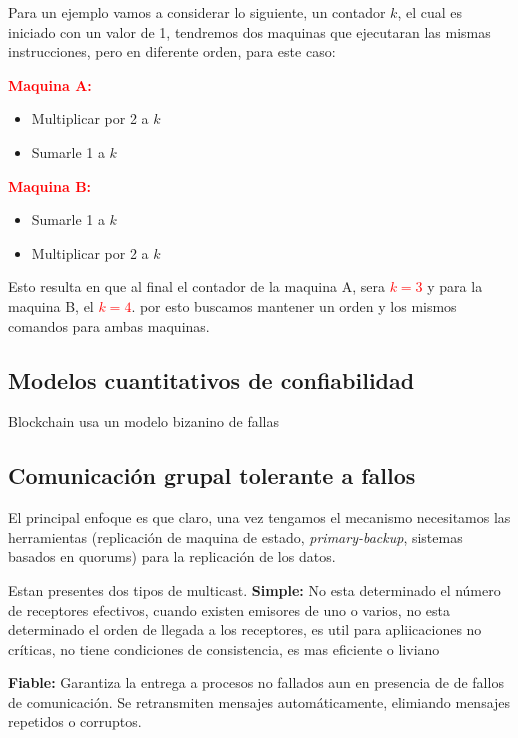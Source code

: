 Para un ejemplo vamos a considerar lo siguiente, un contador $k$, el cual es iniciado con un valor de 1, tendremos dos maquinas que ejecutaran las mismas instrucciones, pero en diferente orden, para este caso:

\textcolor{red}{\textbf{Maquina A:}}
\begin{itemize}
    \item Multiplicar por 2 a $k$
    \item Sumarle 1 a $k$
\end{itemize}
\textcolor{red}{\textbf{Maquina B:}}
\begin{itemize}
    \item Sumarle 1 a $k$
    \item Multiplicar por 2 a $k$
\end{itemize}
\vspace{1mm}

Esto resulta en que al final el contador de la maquina A, sera \textcolor{red}{$k=3$} y para la maquina B, el \textcolor{red}{$k=4$}. por esto buscamos mantener un orden y los mismos comandos para ambas maquinas.

\subsection{Modelos cuantitativos de confiabilidad}










Blockchain usa un modelo bizanino de fallas

\subsection{Comunicación grupal tolerante a fallos}
El principal enfoque es que claro, una vez tengamos el mecanismo necesitamos las herramientas (replicación de maquina de estado, \textit{primary-backup}, sistemas basados en quorums) para la replicación de los datos.

Estan presentes dos tipos de multicast.
\textbf{Simple:}  No esta determinado el número de receptores efectivos, cuando existen emisores de uno o varios, no esta determinado el orden de llegada a los receptores, es util para apliicaciones no críticas, no tiene condiciones de consistencia, es mas eficiente o liviano

\textbf{Fiable:} Garantiza la entrega a procesos no fallados aun en presencia de de fallos de comunicación. Se retransmiten mensajes automáticamente, elimiando mensajes repetidos o corruptos.

